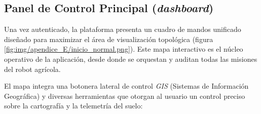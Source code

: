 
\subsection{Panel de Control Principal (\textit{dashboard})}
Una vez autenticado, la plataforma presenta un cuadro de mandos unificado diseñado para maximizar el área de visualización topológica (figura \ref{fig:img/apendice_E/inicio_normal.png}). Este mapa interactivo es el núcleo operativo de la aplicación, desde donde se orquestan y auditan todas las misiones del robot agrícola.


El mapa integra una botonera lateral de control \textit{GIS} (Sistemas de Información Geográfica) y diversas herramientas que otorgan al usuario un control preciso sobre la cartografía y la telemetría del suelo:

